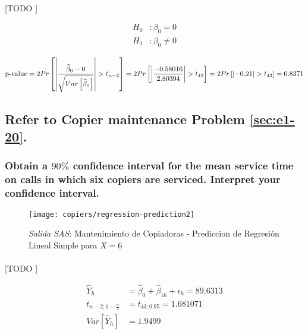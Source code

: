 \documentclass{article}
\begin{document}
        \paragraph{}
        [TODO ]

        \begin{equation}
          \begin{split}
            H_0&: \beta_0 = 0 \\
            H_1&: \beta_0 \neq 0
          \end{split}
        \end{equation}

        \begin{equation}
            \text{p-value}
            = 2Pr\left[\left|\frac{\widehat{\beta}_0 - 0}{\sqrt{Var\left[\widehat{\beta}_0\right]}}\right| > t_{n-2}\right]
            = 2Pr\left[\left|\frac{-0.58016}{2.80394}\right| > t_{43}\right]
            = 2Pr\left[\left|-0.21\right| > t_{43} \right]
            = 0.8371
        \end{equation}

    \setcounter{subsection}{13}
    \subsection{Refer to \textbf{Copier maintenance} Problem \ref{sec:e1-20}.}

      \subsubsection{Obtain a $90\%$ confidence interval for the mean service time on calls in which six copiers are serviced. Interpret your confidence interval.}
      \label{sec:copiers-2.14a}


      \begin{figure}[!h]
        \centering
        \texttt{[image: copiers/regression-prediction2]}
        \caption{\emph{Salida SAS}: Mantenimiento de Copiadoras - Prediccion de Regresión Lineal Simple para $X = 6$}
        \label{img:copiers-regression-prediction2}
      \end{figure}

        \paragraph{}
        [TODO ]

        \begin{align}
          \widehat{Y}_h &= \widehat{\beta}_0 +\widehat{\beta}_16+ \epsilon_h = 89.6313\\
          t_{n-2;1-\frac{\alpha}{2}} &= t_{43;0.95} = 1.681071\\
          Var\left[\widehat{Y}_h \right]  &= 1.9499
        \end{align}
\end{document}
